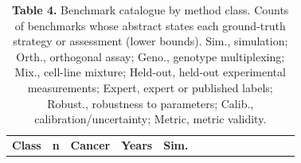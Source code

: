 \documentclass[11pt]{article}
\newenvironment{tablefont}{\par\scriptsize\setlength{\tabcolsep}{3.5pt}}{\par}
\newcommand{\thead}[1]{\textbf{#1}}
\begin{document}
\begin{tablefont}

\setlength{\tabcolsep}{2pt}
\begin{longtable}[l]{@{}
  >{\raggedright\arraybackslash}p{}
  >{\raggedright\arraybackslash}p{}
  >{\raggedright\arraybackslash}p{}
  >{\raggedright\arraybackslash}p{}
  >{\raggedright\arraybackslash}p{}
  >{\raggedright\arraybackslash}p{}
  >{\raggedright\arraybackslash}p{}
  >{\raggedright\arraybackslash}p{}
  >{\raggedright\arraybackslash}p{}
  >{\raggedright\arraybackslash}p{}
  >{\raggedright\arraybackslash}p{}
  >{\raggedright\arraybackslash}p{}
  >{\raggedright\arraybackslash}p{}
  >{\raggedright\arraybackslash}p{}@{}}
\caption{\textbf{Table 4.} Benchmark catalogue by method class. Counts of
benchmarks whose abstract states each ground-truth strategy or
assessment (lower bounds). Sim., simulation; Orth., orthogonal assay;
Geno., genotype multiplexing; Mix., cell-line mixture; Held-out,
held-out experimental measurements; Expert, expert or published labels;
Robust., robustness to parameters; Calib., calibration/uncertainty;
Metric, metric validity.}\tabularnewline
\toprule
\begin{minipage}[b]{\linewidth}\raggedright
\thead{Class}
\end{minipage} & \begin{minipage}[b]{\linewidth}\raggedright
\thead{n}
\end{minipage} & \begin{minipage}[b]{\linewidth}\raggedright
\thead{Cancer}
\end{minipage} & \begin{minipage}[b]{\linewidth}\raggedright
\thead{Years}
\end{minipage} & \begin{minipage}[b]{\linewidth}\raggedright
\thead{Sim.}
\end{minipage} & \begin{minipage}[b]{\linewidth}\raggedright

\end{minipage}
\end{longtable}
\end{tablefont}
\end{document}

